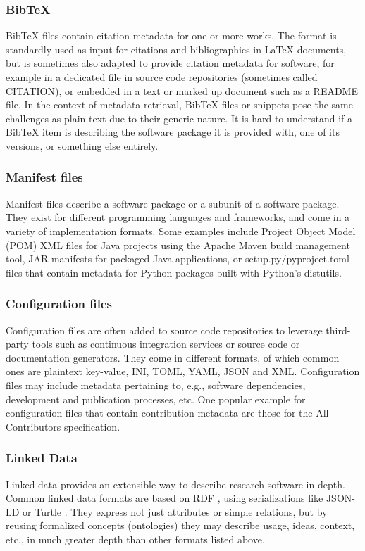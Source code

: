\documentclass{article}
\begin{document}
\subsubsection{BibTeX}\label{dud0m6otfds}
BibTeX files contain citation metadata for one or more works. The format is standardly used as input for citations and bibliographies in LaTeX documents, but is sometimes also adapted to provide citation metadata for software, for example in a dedicated file in source code repositories (sometimes called CITATION), or embedded in a text or marked up document such as a README file. In the context of metadata retrieval, BibTeX files or snippets pose the same challenges as plain text due to their generic nature. It is hard to understand if a BibTeX item is describing the software package it is provided with, one of its versions, or something else entirely.



\subsubsection{Manifest files}\label{l2h424y50o8p}
Manifest files describe a software package or a subunit of a software package. They exist for different programming languages and frameworks, and come in a variety of implementation formats. Some examples include Project Object Model (POM) XML files for Java projects using the Apache Maven build management tool, JAR manifests for packaged Java applications, or setup.py/pyproject.toml files that contain metadata for Python packages built with Python’s distutils.



\subsubsection{Configuration files}\label{f4nteh28mhga}
Configuration files are often added to source code repositories to leverage third-party tools such as continuous integration services or source code or documentation generators. They come in different formats, of which common ones are plaintext key-value, INI, TOML, YAML, JSON and XML. Configuration files may include metadata pertaining to, e.g., software dependencies, development and publication processes, etc. One popular example for configuration files that contain contribution metadata are those for the All Contributors specification.



\subsubsection{Linked Data}\label{ak3lofbxrkd}
Linked data provides an extensible way to describe research software in depth. Common linked data formats are based on RDF \cite{11045035/RZXJXX75}, using serializations like JSON-LD \cite{11045035/DQRH6UQP} or Turtle \cite{11045035/F3ARKWX4}. They express not just attributes or simple relations, but by reusing formalized concepts (ontologies) they may describe usage, ideas, context, etc., in much greater depth than other formats listed above.
\end{document}
